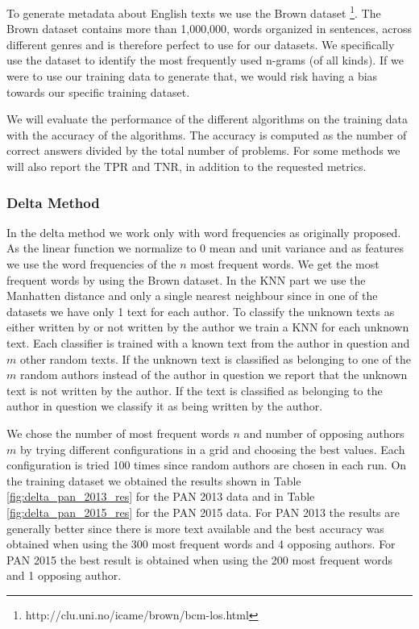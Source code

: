 To generate metadata about English texts we use the Brown dataset
\footnote{http://clu.uni.no/icame/brown/bcm-los.html}. The Brown dataset
contains more than 1,000,000, words organized in sentences, across different
genres and is therefore perfect to use for our datasets. We specifically use the
dataset to identify the most frequently used n-grams (of all kinds). If we were
to use our training data to generate that, we would risk having a bias towards
our specific training dataset.

We will evaluate the performance of the different algorithms on the training
data with the accuracy of the algorithms. The accuracy is computed as the number
of correct answers divided by the total number of problems. For some methods
we will also report the \gls{TPR} and \gls{TNR}, in addition to the requested
metrics.

\subsubsection{Delta Method} \label{subsubsec:method:delta_method}
In the delta method we work only with word frequencies as originally proposed.
As the linear function we normalize to 0 mean and unit variance and as features
we use the word frequencies of the $n$ most frequent words. We get the most
frequent words by using the Brown dataset. In the \gls{KNN} part we use the
Manhatten distance and only a single nearest neighbour since in one of the
datasets we have only 1 text for each author. To classify the unknown texts as
either written by or not written by the author we train a \gls{KNN} for each
unknown text. Each classifier is trained with a known text from the author
in question and $m$ other random texts. If the unknown text is classified as
belonging to one of the $m$ random authors instead of the author in question
we report that the unknown text is not written by the author. If the text is
classified as belonging to the author in question we classify it as being
written by the author.

We chose the number of most frequent words $n$ and number of opposing
authors $m$ by trying different configurations in a grid and choosing the
best values. Each configuration is tried 100 times since random authors are
chosen in each run. On the training dataset we obtained the results shown in
Table \ref{fig:delta_pan_2013_res} for the PAN 2013 data and in Table
\ref{fig:delta_pan_2015_res} for the PAN 2015 data. For PAN 2013 the results are
generally better since there is more text available and the best accuracy was
obtained when using the 300 most frequent words and 4 opposing authors. For PAN
2015 the best result is obtained when using the 200 most frequent words and 1
opposing author.

